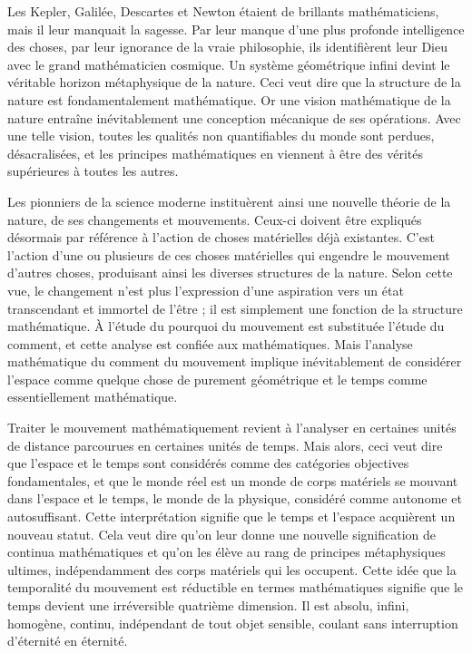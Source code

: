 \documentclass[a4paper,12pt]{article}
\begin{document}
Les Kepler, Galilée, Descartes et Newton étaient de brillants mathématiciens, mais il leur manquait la sagesse. Par leur manque d'une plus profonde intelligence des choses, par leur ignorance de la vraie philosophie, ils identifièrent leur Dieu avec le grand mathématicien cosmique. Un système géométrique infini devint le véritable horizon métaphysique de la nature. Ceci veut dire que la structure de la nature est fondamentalement mathématique. Or une vision mathématique de la nature entraîne inévitablement une conception mécanique de ses opérations. Avec une telle vision, toutes les qualités non quantifiables du monde sont perdues, désacralisées, et les principes mathématiques en viennent à être des vérités supérieures à toutes les autres. 

Les pionniers de la science moderne instituèrent ainsi une nouvelle théorie de la nature, de ses changements et mouvements. Ceux-ci doivent être expliqués désormais par référence à l'action de choses matérielles déjà existantes. C'est l'action d'une ou plusieurs de ces choses matérielles qui engendre le mouvement d'autres choses, produisant ainsi les diverses structures de la nature. Selon cette vue, le changement n'est plus l'expression d'une aspiration vers un état transcendant et immortel de l'être ; il est simplement une fonction de la structure mathématique. À l'étude du pourquoi du mouvement est substituée l'étude du comment, et cette analyse est confiée aux mathématiques. Mais l'analyse mathématique du comment du mouvement implique inévitablement de considérer l'espace comme quelque chose de purement géométrique et le temps comme essentiellement mathématique. 

Traiter le mouvement mathématiquement revient à l'analyser en certaines unités de distance parcourues en certaines unités de temps. Mais alors, ceci veut dire que l'espace et le temps sont considérés comme des catégories objectives fondamentales, et que le monde réel est un monde de corps matériels se mouvant dans l'espace et le temps, le monde de la physique, considéré comme autonome et autosuffisant. Cette interprétation signifie que le temps et l'espace acquièrent un nouveau statut. Cela veut dire qu'on leur donne une nouvelle signification de continua mathématiques et qu'on les élève au rang de principes métaphysiques ultimes, indépendamment des corps matériels qui les occupent. Cette idée que la temporalité du mouvement est réductible en termes mathématiques signifie que le temps devient une irréversible quatrième dimension. Il est absolu, infini, homogène, continu, indépendant de tout objet sensible, coulant sans interruption d'éternité en éternité.
\end{document}
